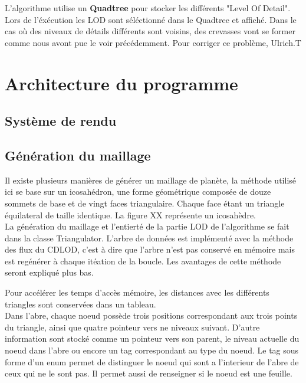 \documentclass[12pt]{report}
\begin{document}
  L'algorithme utilise un \textbf{Quadtree} pour stocker les différents "Level Of Detail". Lors de l'éxécution les LOD
  sont séléctionné dans le Quadtree et affiché. Dans le cas où des niveaux de détails différents sont voisins, des crevasses
  vont se former comme nous avont pue le voir précédemment. Pour corriger ce problème, Ulrich.T 


  

  	
  \chapter{Architecture du programme}
	
    
  
  \section{Système de rendu}
  \section{Génération du maillage}	%
	Il existe plusieurs manières de générer un maillage de planète, la méthode utilisé ici
	se base sur un icosahédron, une forme géométrique composée de douze sommets de base et 
	de vingt faces triangulaire. Chaque face étant un triangle équilateral de taille identique.
	La figure XX représente un icosahèdre.\\

	
	La génération du maillage et l'entierté de la partie LOD de l'algorithme se fait dans la classe Triangulator.
	L'arbre de données est implémenté avec la méthode des flux du CDLOD, c'est à dire que l'arbre n'est
	pas conservé en mémoire mais est regénérer à chaque itéation de la boucle. Les avantages de cette méthode seront 
	expliqué plus bas.
	
	Pour accélérer les temps d'accès mémoire, les distances avec les différents triangles sont conservées
	dans un tableau. \\

	Dans l'abre, chaque noeud possède trois positions correspondant aux trois points du triangle,
	ainsi que quatre pointeur vers ne niveaux suivant.
	D'autre information sont stocké comme un pointeur vers son parent, le niveau actuelle du
	noeud dans l'abre ou encore un tag correspondant au type du noeud.
	Le tag sous forme d'un enum permet de distinguer le noeud qui sont a l'interieur de l'abre de ceux
	qui ne le sont pas. Il permet aussi de renseigner si le noeud est une feuille.
		
\end{document}
